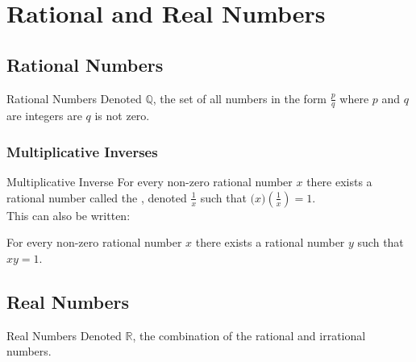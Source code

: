 \documentclass[\main/notes.tex]{subfiles}
\begin{document}
	\ifSubfilesClassLoaded{\setcounter{chapter}{1}}{}
	\chapter{Rational and Real Numbers}
		\section{Rational Numbers}
			\begin{definition}{Rational Numbers}
				Denoted $\mathbb{Q}$, the set of all numbers in the form $\frac{p}{q}$ where $p$ and $q$ are integers are $q$ is not zero.
			\end{definition}
			\subsection{Multiplicative Inverses}
				\begin{definition}{Multiplicative Inverse}
					For every non-zero rational number $x$ there exists a rational number called the , denoted $\frac{1}{x}$ such that $\bigl(x\bigr)\left(\frac{1}{x}\right) = 1$.\\
					\nopagebreak
					This can also be written:
					\nopagebreak
					\begin{indentparagraph}
						For every non-zero rational number $x$ there exists a rational number $y$ such that $xy = 1$.
					\end{indentparagraph}
				\end{definition}
		\section{Real Numbers}
				\begin{definition}{Real Numbers}
					Denoted $\mathbb{R}$, the combination of the rational and irrational numbers.
				\end{definition}
\end{document}
